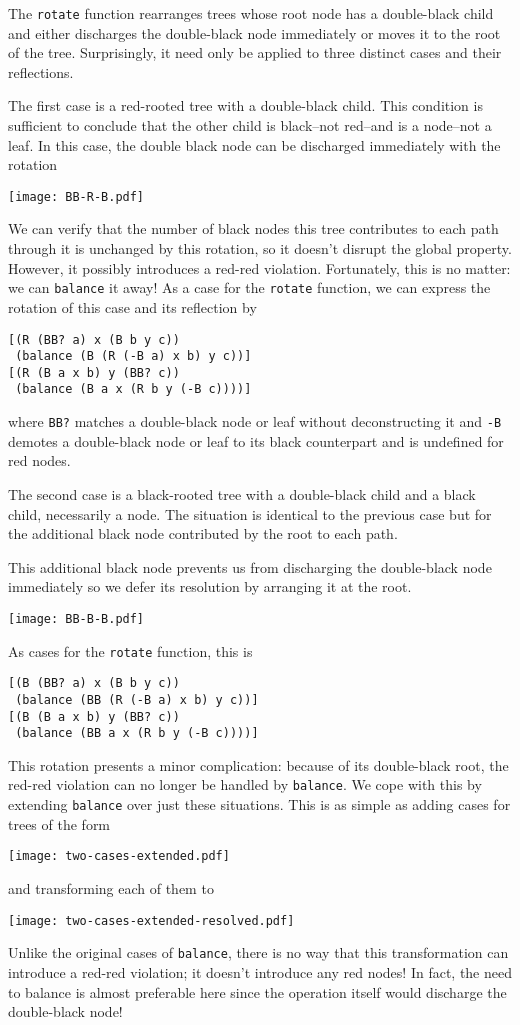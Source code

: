 \documentclass[preprint]{sigplanconf}
\begin{document}
The \texttt{rotate} function rearranges trees whose root node has a double-black child and either discharges the double-black node immediately or moves it to the root of the tree. Surprisingly, it need only be applied to three distinct cases and their reflections.

The first case is a red-rooted tree with a double-black child. This condition is sufficient to conclude that the other child is black--not red--and is a node--not a leaf. In this case, the double black node can be discharged immediately with the rotation
\begin{center}
\texttt{[image: BB-R-B.pdf]}
\end{center}
We can verify that the number of black nodes this tree contributes to each path through it is unchanged by this rotation, so it doesn't disrupt the global property. However, it possibly introduces a red-red violation. Fortunately, this is no matter: we can \texttt{balance} it away! As a case for the \texttt{rotate} function, we can express the rotation of this case and its reflection by
\begin{verbatim}
[(R (BB? a) x (B b y c))
 (balance (B (R (-B a) x b) y c))]
[(R (B a x b) y (BB? c))
 (balance (B a x (R b y (-B c))))]
\end{verbatim}
where \texttt{BB?} matches a double-black node or leaf without deconstructing it and \texttt{-B} demotes a double-black node or leaf to its black counterpart and is undefined for red nodes.

The second case is a black-rooted tree with a double-black child and a black child, necessarily a node. The situation is identical to the previous case but for the additional black node contributed by the root to each path.

This additional black node prevents us from discharging the double-black node immediately so we defer its resolution by arranging it at the root.
\begin{center}
\texttt{[image: BB-B-B.pdf]}
\end{center}
As cases for the \texttt{rotate} function, this is
\begin{verbatim}
[(B (BB? a) x (B b y c))
 (balance (BB (R (-B a) x b) y c))]
[(B (B a x b) y (BB? c))
 (balance (BB a x (R b y (-B c))))]
\end{verbatim}
This rotation presents a minor complication: because of its double-black root, the red-red violation can no longer be handled by \texttt{balance}. We cope with this by extending \texttt{balance} over just these situations. This is as simple as adding cases for trees of the form
\begin{center}
\texttt{[image: two-cases-extended.pdf]}
\end{center}
and transforming each of them to
\begin{center}
\texttt{[image: two-cases-extended-resolved.pdf]}
\end{center}
Unlike the original cases of \texttt{balance}, there is no way that this transformation can introduce a red-red violation; it doesn't introduce any red nodes! In fact, the need to balance is almost preferable here since the operation itself would discharge the double-black node!
\end{document}
